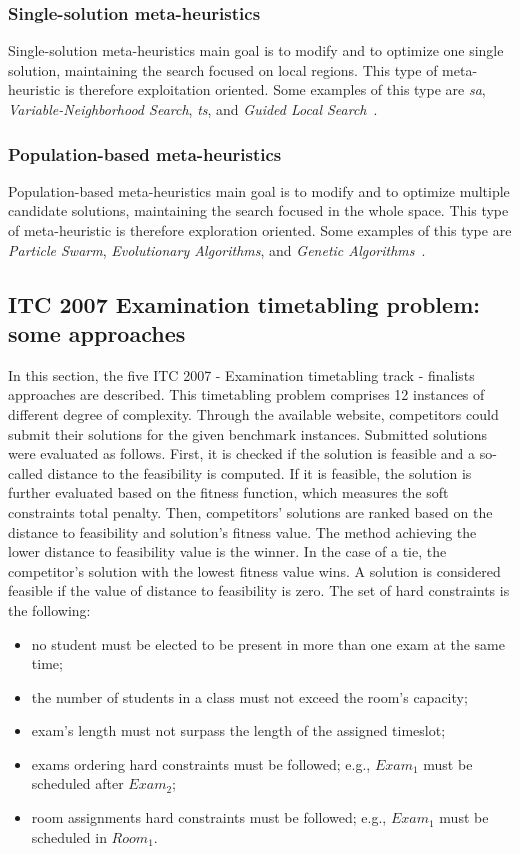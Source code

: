 \subsubsection{Single-solution meta-heuristics}
Single-solution meta-heuristics main goal is to modify and to optimize one single solution, maintaining the search focused on local regions. This type of meta-heuristic is therefore exploitation oriented. Some examples of this type are \textit{\gls{sa}}, \textit{Variable-Neighborhood Search}, \textit{\gls{ts}}, and \textit{Guided Local Search}~\cite{Talbi2009}. \\

\subsubsection{Population-based meta-heuristics}
Population-based meta-heuristics main goal is to modify and to optimize multiple candidate solutions, maintaining the search focused in the whole space. This type of meta-heuristic is therefore exploration oriented. Some examples of this type are \textit{Particle Swarm}, \textit{Evolutionary Algorithms}, and \textit{Genetic Algorithms}~\cite{Talbi2009}.\\


\subsection{ITC 2007 Examination timetabling problem: some approaches}
\label{subsection:ApprITC2007}

In this section, the five ITC 2007 - Examination timetabling track - finalists approaches are described. This timetabling problem comprises 12 instances of different degree of complexity. Through the available website, competitors could submit their solutions for the given benchmark instances. Submitted solutions were evaluated as follows. First, it is checked if the solution is feasible and a so-called distance to the feasibility is computed. If it is feasible, the solution is further evaluated based on the fitness function, which measures the soft constraints total penalty. Then, competitors' solutions are ranked based on the distance to feasibility and solution's fitness value. The method achieving the lower distance to feasibility value is the winner. In the case of a tie, the competitor's solution with the lowest fitness value wins. A solution is considered feasible if the value of distance to feasibility is zero. The set of hard constraints is the following:
\begin{itemize}
	\item no student must be elected to be present in more than one exam at the same time;
	\item the number of students in a class must not exceed the room's capacity;
	\item exam's length must not surpass the length of the assigned timeslot;
	\item exams ordering hard constraints must be followed; e.g., $Exam_1$ must be scheduled after $Exam_2$;
	\item room assignments hard constraints must be followed; e.g., 	$Exam_1$ must be scheduled in $Room_1$.
\end{itemize}

